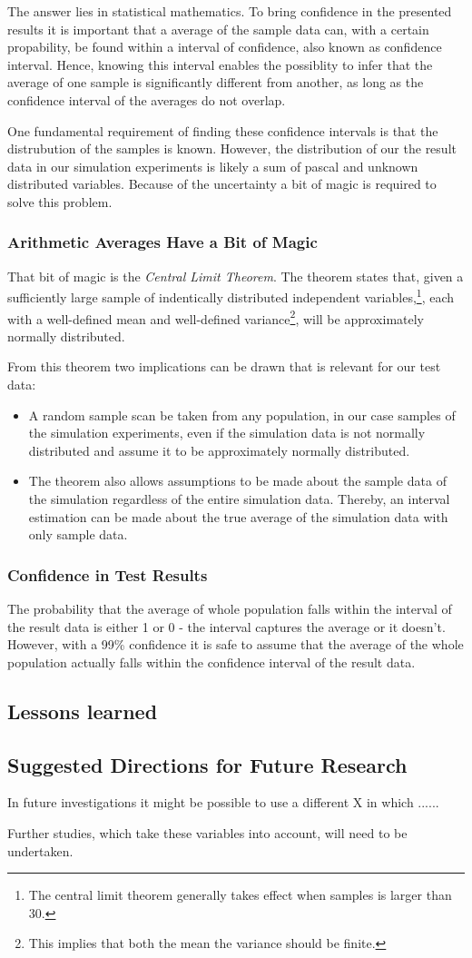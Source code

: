 The answer lies in statistical mathematics. To bring confidence in the presented results it is important that a average of the sample data can, with a certain propability, be found within a interval of confidence, also known as confidence interval. Hence, knowing this interval enables the possiblity to infer that the average of one sample is significantly different from another, as long as the confidence interval of the averages do not overlap.

One fundamental requirement of finding these confidence intervals is that the distrubution of the samples is known. However, the distribution of our the result data in our simulation experiments is likely a sum of pascal and unknown distributed variables. Because of the uncertainty a bit of magic is required to solve this problem. 

\subsubsection{Arithmetic Averages Have a Bit of Magic}
That bit of magic is the \emph{Central Limit Theorem}. The theorem states that, given a sufficiently large sample of indentically distributed independent variables,\footnote{The central limit theorem generally takes effect when samples is larger than 30.}, each with a well-defined mean and well-defined variance\footnote{This implies that both the mean the variance should be finite.}, will be approximately normally distributed\cite{gunnar}.

From this theorem two implications can be drawn that is relevant for our test data:
\begin{itemize}
\item A random sample scan be taken from any population, in our case samples of the simulation experiments, even if the simulation data is not normally distributed and assume it to be approximately normally distributed.

\item The theorem also allows assumptions to be made about the sample data of the simulation regardless of the entire simulation data. Thereby, an interval estimation can be made about the true average of the simulation data with only sample data.
\end{itemize}

 \subsubsection{Confidence in Test Results}
The probability that the average of whole population falls within the interval of the result data is either 1 or 0 - the interval captures the average or it doesn't\cite{gunnar}. However, with a 99\% confidence it is safe to assume that the average of the whole population actually falls within the confidence interval of the result data. 


\subsection{Lessons learned}
\subsection{Suggested Directions for Future Research}

In future investigations it might be possible to use a different X in which ...... 

Further studies, which take these variables into account, will need to be undertaken.
